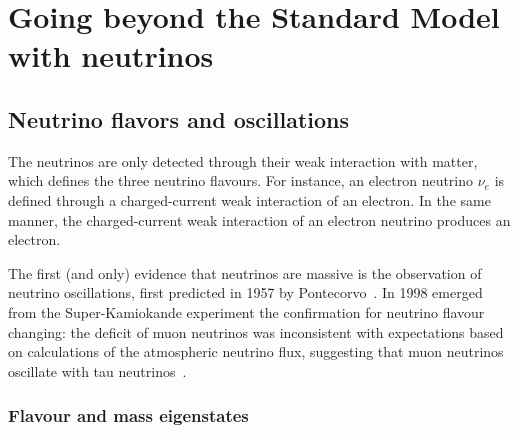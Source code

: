 \section{Going beyond the Standard Model with neutrinos}
\subsection{Neutrino flavors and oscillations}

The neutrinos are only detected through their weak interaction with matter, which defines the three neutrino flavours.
For instance, an electron neutrino $\nu_e$ is defined through a charged-current weak interaction of an electron.
In the same manner, the charged-current weak interaction of an electron neutrino produces an electron.

The first (and only) evidence that neutrinos are massive is the observation of neutrino oscillations, first predicted in 1957 by Pontecorvo~\cite{art:pontecorvo_1958}.
In 1998 emerged from the Super-Kamiokande experiment the confirmation for neutrino flavour changing: the deficit of muon neutrinos was inconsistent with expectations based on calculations of the atmospheric neutrino flux, suggesting that muon neutrinos oscillate with tau neutrinos~\cite{art:kamiokande_1998}.

\subsubsection*{Flavour and mass eigenstates}


